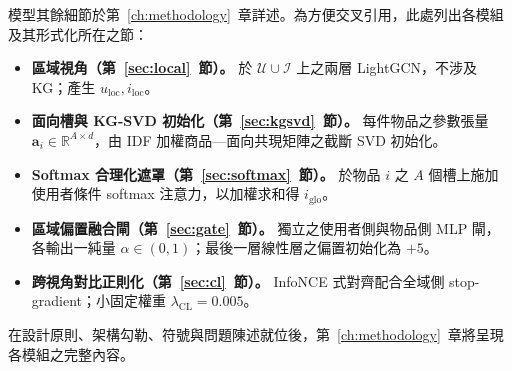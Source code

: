模型其餘細節於第~\ref{ch:methodology}~章詳述。為方便交叉引用，此處列出各模組及其形式化所在之節：

\begin{itemize}
  \item \textbf{區域視角（第~\ref{sec:local}~節）。} 於 $\mathcal{U} \cup \mathcal{I}$ 上之兩層 LightGCN，不涉及 KG；產生 $u_{\mathrm{loc}}, i_{\mathrm{loc}}$。
  \item \textbf{面向槽與 KG-SVD 初始化（第~\ref{sec:kgsvd}~節）。} 每件物品之參數張量 $\mathbf{a}_i \in \mathbb{R}^{A \times d}$，由 IDF 加權商品—面向共現矩陣之截斷 SVD 初始化。
  \item \textbf{Softmax 合理化遮罩（第~\ref{sec:softmax}~節）。} 於物品 $i$ 之 $A$ 個槽上施加使用者條件 softmax 注意力，以加權求和得 $i_{\mathrm{glo}}$。
  \item \textbf{區域偏置融合閘（第~\ref{sec:gate}~節）。} 獨立之使用者側與物品側 MLP 閘，各輸出一純量 $\alpha \in (0, 1)$；最後一層線性層之偏置初始化為 $+5$。
  \item \textbf{跨視角對比正則化（第~\ref{sec:cl}~節）。} InfoNCE 式對齊配合全域側 stop-gradient；小固定權重 $\lambda_{\mathrm{CL}} = 0.005$。
\end{itemize}

在設計原則、架構勾勒、符號與問題陳述就位後，第~\ref{ch:methodology}~章將呈現各模組之完整內容。
